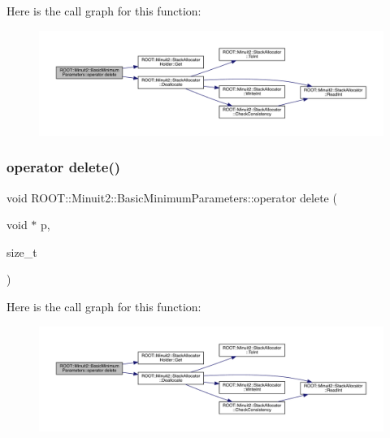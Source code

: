 Here is the call graph for this function\+:
\nopagebreak
\begin{figure}[H]
\begin{center}
\leavevmode
\includegraphics[width=350pt]{da/d30/classROOT_1_1Minuit2_1_1BasicMinimumParameters_aaaef6d3167e6f4a88182d6f171641fb9_cgraph}
\end{center}
\end{figure}
\mbox{\label{classROOT_1_1Minuit2_1_1BasicMinimumParameters_aaaef6d3167e6f4a88182d6f171641fb9}} 
\subsubsection{\texorpdfstring{operator delete()}{operator delete()}\hspace{0.1cm}{\footnotesize\ttfamily [2/2]}}
{\footnotesize\ttfamily void R\+O\+O\+T\+::\+Minuit2\+::\+Basic\+Minimum\+Parameters\+::operator delete (\begin{DoxyParamCaption}\item[{void $\ast$}]{p,  }\item[{size\+\_\+t}]{ }\end{DoxyParamCaption})\hspace{0.3cm}{\ttfamily [inline]}}

Here is the call graph for this function\+:
\nopagebreak
\begin{figure}[H]
\begin{center}
\leavevmode
\includegraphics[width=350pt]{da/d30/classROOT_1_1Minuit2_1_1BasicMinimumParameters_aaaef6d3167e6f4a88182d6f171641fb9_cgraph}
\end{center}
\end{figure}
\mbox{\label{classROOT_1_1Minuit2_1_1BasicMinimumParameters_a5258a9959c0b6ff699a9200dad4caee0}} 
